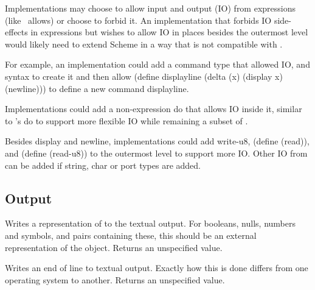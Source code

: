 \begin{rationale}
  Implementations may choose to allow input and output (IO) from
  expressions (like \rsevenrs\ allows) or choose to forbid it.  An
  implementation that forbids IO side-effects in expressions but
  wishes to allow IO in places besides the outermost level would
  likely need to extend Scheme in a way that is not compatible with
  \rsevenrs.

  For example, an implementation could add a command type that allowed
  IO, and syntax to create it and then allow {\cf (define displayline
    (delta (x) (display x) (newline)))} to define a new command {\cf
    displayline}.

  Implementations could add a non-expression {\cf do} that allows
  IO inside it, similar to \rsevenrs's {\cf do} to support more
  flexible IO while remaining a subset of \rsevenrs.

  Besides {\cf display} and {\cf newline}, implementations could add
  {\cf write-u8}, {\cf (define}  {\cf (read))}, and
  {\cf (define}  {\cf (read-u8))} to the outermost
  level to support more IO. Other IO from \rsevenrs{} can be added if
  string, char or port types are added.
\end{rationale}

\subsection{Output}
\label{outputsection}

\begin{entry}{%
}

Writes a representation of  to the textual output.  For
booleans, nulls, numbers and symbols, and pairs containing these, this
should be an external representation of the object.  Returns an
unspecified value.

\end{entry}

\begin{entry}{%
}

Writes an end of line to textual output.  Exactly how this
is done differs
from one operating system to another. Returns an unspecified value.

\end{entry}
